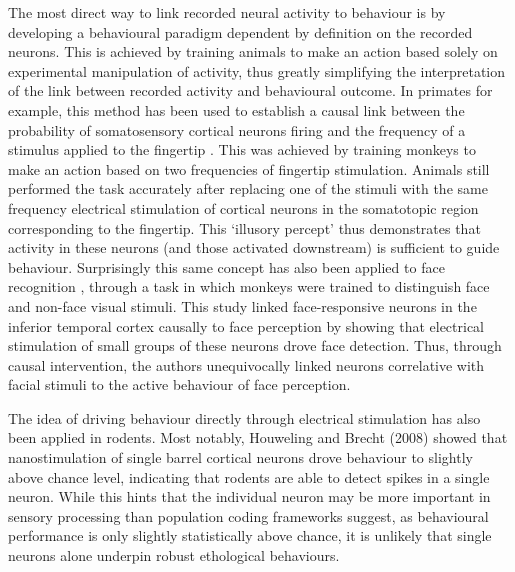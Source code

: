 The most direct way to link recorded neural activity to behaviour is by developing a behavioural paradigm dependent by definition on the recorded neurons. This is achieved by training animals to make an action based solely on experimental manipulation of activity, thus greatly simplifying the interpretation of the link between recorded activity and behavioural outcome. In primates for example, this method has been used to establish a causal link between the probability of somatosensory cortical neurons firing and the frequency of a stimulus applied to the fingertip \cite{romo_somatosensory_1998}. This was achieved by training monkeys to make an action based on two frequencies of fingertip stimulation. Animals still performed the task accurately after replacing one of the stimuli with the same frequency electrical stimulation of cortical neurons in the somatotopic region corresponding to the fingertip. This ‘illusory percept’ thus demonstrates that activity in these neurons (and those activated downstream) is sufficient to guide behaviour. Surprisingly this same concept has also been applied to face recognition \cite{afraz_microstimulation_2006}, through a task in which monkeys were trained to distinguish face and non-face visual stimuli. This study linked face-responsive neurons in the inferior temporal cortex causally to face perception by showing that electrical stimulation of small groups of these neurons drove face detection. Thus, through causal intervention, the authors unequivocally linked neurons correlative with facial stimuli to the active behaviour of face perception.

The idea of driving behaviour directly through electrical stimulation has also been applied in rodents. Most notably, Houweling and Brecht (2008) \cite{houweling_behavioural_2008} showed that nanostimulation of single barrel cortical neurons drove behaviour to slightly above chance level, indicating that rodents are able to detect spikes in a single neuron. While this hints that the individual neuron may be more important in sensory processing than population coding frameworks \cite{averbeck_neural_2006} suggest, as behavioural performance is only slightly statistically above chance, it is unlikely that single neurons alone underpin robust ethological behaviours.

